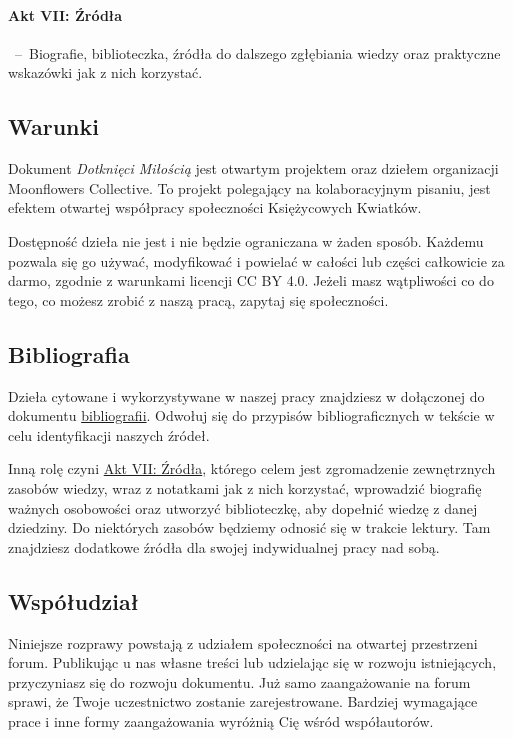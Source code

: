 \documentclass[]{coda-art}
\begin{document}
\paragraph*{Akt VII: Źródła}\, --\, Biografie, biblioteczka, źródła do dalszego zgłębiania wiedzy oraz praktyczne wskazówki jak z nich korzystać.

\begin{multicols}{2}
    \subsection*{Warunki}
    Dokument \emph{Dotknięci Miłością} jest otwartym projektem oraz dziełem organizacji Moonflowers Collective.
    To projekt polegający na kolaboracyjnym pisaniu, jest efektem otwartej współpracy społeczności Księżycowych Kwiatków.

    Dostępność dzieła nie jest i nie będzie ograniczana w żaden sposób.
    Każdemu pozwala się go używać, modyfikować i powielać w całości lub części całkowicie za darmo, zgodnie z warunkami licencji CC BY 4.0.
    Jeżeli masz wątpliwości co do tego, co możesz zrobić z naszą pracą, zapytaj się społeczności.

    \subsection*{Bibliografia}
    Dzieła cytowane i wykorzystywane w naszej pracy znajdziesz w dołączonej do dokumentu \hyperref[bibliografia]{bibliografii}.
    Odwołuj się do przypisów bibliograficznych w tekście w celu identyfikacji naszych źródeł.

    Inną rolę czyni \hyperref[akt:zrodla]{Akt VII: Źródła}, którego celem jest zgromadzenie zewnętrznych zasobów wiedzy,
    wraz z notatkami jak z nich korzystać, wprowadzić biografię ważnych osobowości 
    oraz utworzyć biblioteczkę, aby dopełnić wiedzę z danej dziedziny.
    Do niektórych zasobów będziemy odnosić się w trakcie lektury.
    Tam znajdziesz dodatkowe źródła dla swojej indywidualnej pracy nad sobą.
    \vspace*{-0.8em}

    \columnbreak

    \subsection*{Współudział}
    Niniejsze rozprawy powstają z udziałem społeczności na otwartej przestrzeni forum.
    Publikując u nas własne treści lub udzielając się w rozwoju istniejących, przyczyniasz się do rozwoju dokumentu.
    Już samo zaangażowanie na forum sprawi, że Twoje uczestnictwo zostanie zarejestrowane.
    Bardziej wymagające prace i inne formy zaangażowania wyróżnią Cię wśród współautorów.


\end{multicols}
\end{document}
